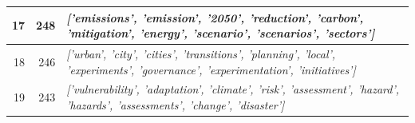 \documentclass[12pt]{article}
\begin{document}
\begin{landscape}
\begin{table}[]
\begin{tabular}{|r|r|l|}
17                                   & 248                                 & \textit{{[}'emissions', 'emission', '2050', 'reduction', 'carbon', 'mitigation', 'energy', 'scenario', 'scenarios', 'sectors'{]}}                               \\ \hline
18                                   & 246                                 & \textit{{[}'urban', 'city', 'cities', 'transitions', 'planning', 'local', 'experiments', 'governance', 'experimentation', 'initiatives'{]}}                     \\ \hline
19                                   & 243                                 & \textit{{[}'vulnerability', 'adaptation', 'climate', 'risk', 'assessment', 'hazard', 'hazards', 'assessments', 'change', 'disaster'{]}}                         \\ \hline
\end{tabular}
\end{table}
\end{landscape}
\end{document}
